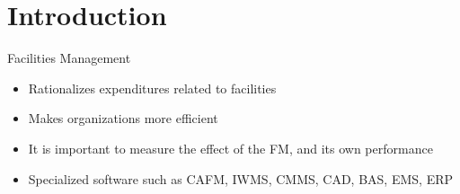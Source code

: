 
\section{Introduction}



\begin{frame}{Facilities Management}

	\begin{itemize}

	\item Rationalizes expenditures related to facilities \\

	\vspace{0.5cm}

	\item Makes organizations more efficient \\

	\vspace{0.5cm}

	\item It is important to measure the effect of the FM, and its own performance

	\vspace{0.5cm}

	\item Specialized software such as CAFM, IWMS, CMMS, CAD, BAS, EMS, ERP  
	\end{itemize}
\end{frame}
